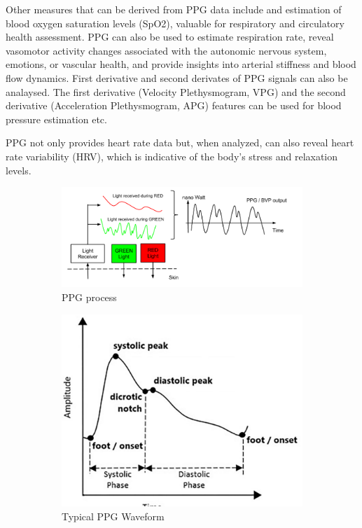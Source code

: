 Other measures that can be derived from PPG data include  and estimation of blood oxygen saturation levels (SpO2), valuable for respiratory and circulatory health assessment. PPG can also be used to estimate respiration rate, reveal vasomotor activity changes associated with the autonomic nervous system, emotions, or vascular health, and provide insights into arterial stiffness and blood flow dynamics. First derivative and second derivates of PPG signals can also be analaysed. The first derivative (Velocity Plethysmogram, VPG) and the second derivative (Acceleration Plethysmogram, APG) features can be used for  blood pressure estimation etc.\parencite{apg}



PPG not only provides heart rate data but, when analyzed, can also reveal heart rate variability (HRV), which is indicative of the body's stress and relaxation levels.

\begin{figure}[h]
    \centering
    \begin{subfigure}[b]{0.55\columnwidth}
        \includegraphics[width=\textwidth]{images/PPG.png}
        \caption{PPG process}
        \label{fig:ppg}
    \end{subfigure}
    \begin{subfigure}[b]{0.35\columnwidth}
        \includegraphics[width=\textwidth]{images/ppg2.png}
        \caption{Typical PPG Waveform}
        \label{fig:phone2}
    \end{subfigure}
    \caption{\parencite{emp} \parencite{apg}}
    \label{fig:phone}
\end{figure}



